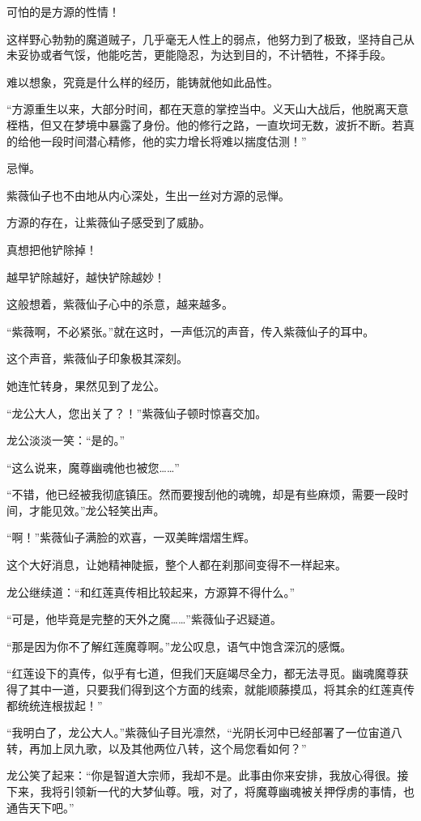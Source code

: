 \begin{this_body}
可怕的是方源的性情！

这样野心勃勃的魔道贼子，几乎毫无人性上的弱点，他努力到了极致，坚持自己从未妥协或者气馁，他能吃苦，更能隐忍，为达到目的，不计牺牲，不择手段。

难以想象，究竟是什么样的经历，能铸就他如此品性。

“方源重生以来，大部分时间，都在天意的掌控当中。义天山大战后，他脱离天意桎梏，但又在梦境中暴露了身份。他的修行之路，一直坎坷无数，波折不断。若真的给他一段时间潜心精修，他的实力增长将难以揣度估测！”

忌惮。

紫薇仙子也不由地从内心深处，生出一丝对方源的忌惮。

方源的存在，让紫薇仙子感受到了威胁。

真想把他铲除掉！

越早铲除越好，越快铲除越妙！

这般想着，紫薇仙子心中的杀意，越来越多。

“紫薇啊，不必紧张。”就在这时，一声低沉的声音，传入紫薇仙子的耳中。

这个声音，紫薇仙子印象极其深刻。

她连忙转身，果然见到了龙公。

“龙公大人，您出关了？！”紫薇仙子顿时惊喜交加。

龙公淡淡一笑：“是的。”

“这么说来，魔尊幽魂他也被您……”

“不错，他已经被我彻底镇压。然而要搜刮他的魂魄，却是有些麻烦，需要一段时间，才能见效。”龙公轻笑出声。

“啊！”紫薇仙子满脸的欢喜，一双美眸熠熠生辉。

这个大好消息，让她精神陡振，整个人都在刹那间变得不一样起来。

龙公继续道：“和红莲真传相比较起来，方源算不得什么。”

“可是，他毕竟是完整的天外之魔……”紫薇仙子迟疑道。

“那是因为你不了解红莲魔尊啊。”龙公叹息，语气中饱含深沉的感慨。

“红莲设下的真传，似乎有七道，但我们天庭竭尽全力，都无法寻觅。幽魂魔尊获得了其中一道，只要我们得到这个方面的线索，就能顺藤摸瓜，将其余的红莲真传都统统连根拔起！”

“我明白了，龙公大人。”紫薇仙子目光凛然，“光阴长河中已经部署了一位宙道八转，再加上凤九歌，以及其他两位八转，这个局您看如何？”

龙公笑了起来：“你是智道大宗师，我却不是。此事由你来安排，我放心得很。接下来，我将引领新一代的大梦仙尊。哦，对了，将魔尊幽魂被关押俘虏的事情，也通告天下吧。”


\end{this_body}
